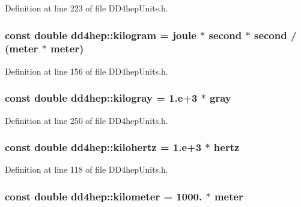 Definition at line 223 of file DD4hepUnits.h.\hypertarget{namespacedd4hep_a94c5d58440a5bf3d43b1edaa51ae5294}{
\subsubsection[{kilogram}]{\setlength{\rightskip}{0pt plus 5cm}const double {\bf dd4hep::kilogram} = {\bf joule} $\ast$ {\bf second} $\ast$ {\bf second} / ({\bf meter} $\ast$ {\bf meter})}}
\label{namespacedd4hep_a94c5d58440a5bf3d43b1edaa51ae5294}


Definition at line 156 of file DD4hepUnits.h.\hypertarget{namespacedd4hep_a865c3d39459c3a51f6ac00236482908a}{
\subsubsection[{kilogray}]{\setlength{\rightskip}{0pt plus 5cm}const double {\bf dd4hep::kilogray} = 1.e+3 $\ast$ {\bf gray}}}
\label{namespacedd4hep_a865c3d39459c3a51f6ac00236482908a}


Definition at line 250 of file DD4hepUnits.h.\hypertarget{namespacedd4hep_a047776833f7632dfbfa1b7e4aa17ffd0}{
\subsubsection[{kilohertz}]{\setlength{\rightskip}{0pt plus 5cm}const double {\bf dd4hep::kilohertz} = 1.e+3 $\ast$ {\bf hertz}}}
\label{namespacedd4hep_a047776833f7632dfbfa1b7e4aa17ffd0}


Definition at line 118 of file DD4hepUnits.h.\hypertarget{namespacedd4hep_a689bd0289c6c83e392d385bc870a34ab}{
\subsubsection[{kilometer}]{\setlength{\rightskip}{0pt plus 5cm}const double {\bf dd4hep::kilometer} = 1000. $\ast$ {\bf meter}}}
\label{namespacedd4hep_a689bd0289c6c83e392d385bc870a34ab}


